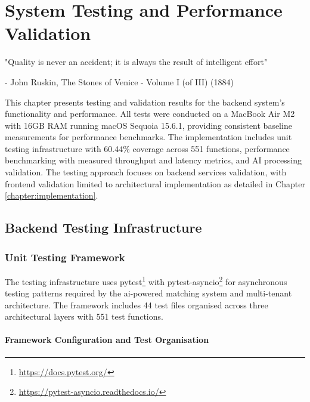 \chapter{System Testing and Performance Validation}
\label{chapter:testing_validation}

\begin{introduction}
"Quality is never an accident; it is always the result of intelligent effort"

- John Ruskin, The Stones of Venice - Volume I (of III) (1884)
\end{introduction}

This chapter presents testing and validation results for the backend system's functionality and performance. All tests were conducted on a MacBook Air M2 with 16GB RAM running macOS Sequoia 15.6.1, providing consistent baseline measurements for performance benchmarks. The implementation includes unit testing infrastructure with 60.44\% coverage across 551 functions, performance benchmarking with measured throughput and latency metrics, and AI processing validation. The testing approach focuses on backend services validation, with frontend validation limited to architectural implementation as detailed in Chapter \ref{chapter:implementation}.


\section{Backend Testing Infrastructure} \label{section:backend_testing}

\subsection{Unit Testing Framework} \label{subsection:unit_testing_framework}

The testing infrastructure uses pytest\footnote{\url{https://docs.pytest.org/}} with pytest-asyncio\footnote{\url{https://pytest-asyncio.readthedocs.io/}} for asynchronous testing patterns required by the \ac{ai}-powered matching system and multi-tenant architecture. The framework includes 44 test files organised across three architectural layers with 551 test functions.

\subsubsection{Framework Configuration and Test Organisation}

